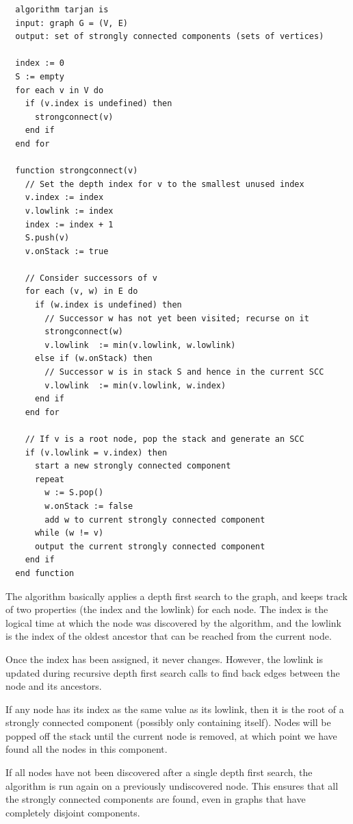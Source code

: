 \begin{lstlisting}
  algorithm tarjan is
  input: graph G = (V, E)
  output: set of strongly connected components (sets of vertices)

  index := 0
  S := empty
  for each v in V do
    if (v.index is undefined) then
      strongconnect(v)
    end if
  end for

  function strongconnect(v)
    // Set the depth index for v to the smallest unused index
    v.index := index
    v.lowlink := index
    index := index + 1
    S.push(v)
    v.onStack := true

    // Consider successors of v
    for each (v, w) in E do
      if (w.index is undefined) then
        // Successor w has not yet been visited; recurse on it
        strongconnect(w)
        v.lowlink  := min(v.lowlink, w.lowlink)
      else if (w.onStack) then
        // Successor w is in stack S and hence in the current SCC
        v.lowlink  := min(v.lowlink, w.index)
      end if
    end for

    // If v is a root node, pop the stack and generate an SCC
    if (v.lowlink = v.index) then
      start a new strongly connected component
      repeat
        w := S.pop()
        w.onStack := false
        add w to current strongly connected component
      while (w != v)
      output the current strongly connected component
    end if
  end function
\end{lstlisting}

The algorithm basically applies a depth first search to the graph, and keeps
track of two properties (the index and the lowlink) for each node. The index is
the logical time at which the node was discovered by the algorithm, and the
lowlink is the index of the oldest ancestor that can be reached from the current
node.

Once the index has been assigned, it never changes. However, the lowlink is
updated during recursive depth first search calls to find back edges between the
node and its ancestors.

If any node has its index as the same value as its lowlink, then it is the root
of a strongly connected component (possibly only containing itself). Nodes will
be popped off the stack until the current node is removed, at which point we
have found all the nodes in this component.

If all nodes have not been discovered after a single depth first search, the
algorithm is run again on a previously undiscovered node. This ensures that all
the strongly connected components are found, even in graphs that have completely
disjoint components.

